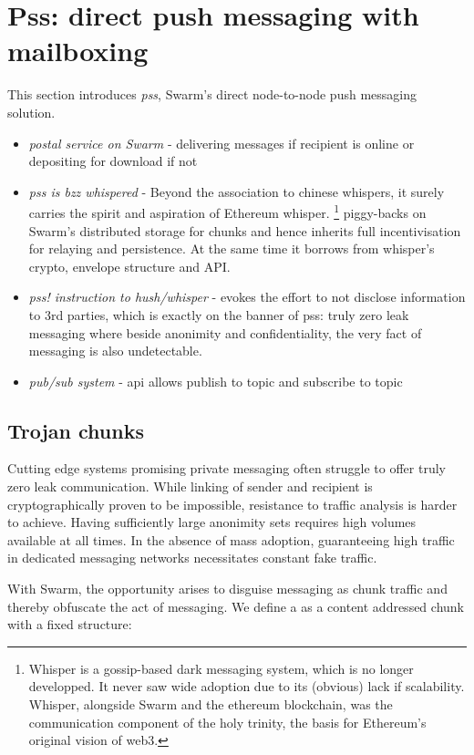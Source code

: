 \section{Pss: direct push messaging with mailboxing}\label{sec:pss}

This section introduces \emph{pss}, Swarm's direct node-to-node push messaging solution. 
\begin{itemize}
\item \emph{postal service on Swarm} - delivering messages if recipient is online or depositing for download if not
\item \emph{pss is bzz whispered} - Beyond the association to chinese whispers, it surely carries the spirit and aspiration of Ethereum whisper.%
%
\footnote{Whisper is a gossip-based dark messaging system, which is no longer developped. It never saw wide adoption due to its (obvious) lack if  scalability. Whisper, alongside Swarm and the ethereum blockchain, was the communication component of the holy trinity, the basis for Ethereum's original vision of web3.}
%
piggy-backs on Swarm's distributed storage for chunks and hence inherits full incentivisation for relaying and persistence. At the same time it borrows from whisper's crypto, envelope structure and API.
\item \emph{pss! instruction to hush/whisper} - evokes the effort to not disclose information to 3rd parties, which is exactly on the banner of pss: truly zero  leak messaging where beside anonimity and confidentiality, the very fact of messaging is also undetectable.
\item  \emph{pub/sub system} - api allows publish to topic and subscribe to topic
\end{itemize}


\subsection{Trojan chunks}\label{sec:trojan}

Cutting edge systems promising private messaging often struggle to offer truly zero leak communication. While linking of sender and recipient is cryptographically proven to be impossible, resistance to traffic analysis is harder to achieve. Having sufficiently large anonimity sets requires high volumes available at all times. In the absence of mass adoption, guaranteeing high traffic in dedicated messaging networks necessitates constant fake traffic. 

With Swarm, the opportunity arises to disguise messaging as chunk traffic and thereby obfuscate the act of messaging. We define a  as a content addressed chunk with a fixed structure:


